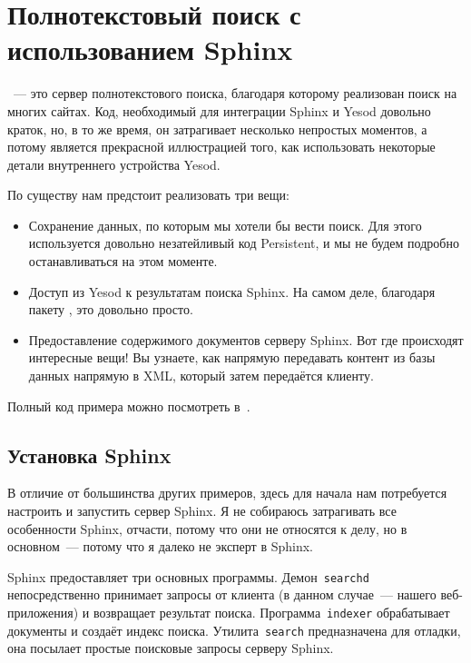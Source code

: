 \chapter{Полнотекстовый поиск с использованием Sphinx}\label{chap:sphinx}
~--- это сервер полнотекстового поиска, благодаря которому реализован поиск на многих сайтах. Код, необходимый для интеграции Sphinx и Yesod довольно краток, но, в то же время, он затрагивает несколько непростых моментов, а потому является прекрасной иллюстрацией того, как использовать некоторые детали внутреннего устройства Yesod.

По существу нам предстоит реализовать три вещи:
\begin{itemize}
  \item Сохранение данных, по которым мы хотели бы вести поиск. Для этого используется довольно незатейливый код Persistent, и мы не будем подробно останавливаться на этом моменте.
  \item Доступ из Yesod к результатам поиска Sphinx. На самом деле, благодаря пакету , это довольно просто.
  \item Предоставление содержимого документов серверу Sphinx. Вот где происходят интересные вещи! Вы узнаете, как напрямую передавать контент из базы данных напрямую в XML, который затем передаётся клиенту.
\end{itemize}

Полный код примера можно посмотреть в~.

\section{Установка Sphinx}
В отличие от большинства других примеров, здесь для начала нам потребуется настроить и запустить сервер Sphinx. Я не собираюсь затрагивать все особенности Sphinx, отчасти, потому что они не относятся к делу, но в основном~--- потому что я далеко не эксперт в Sphinx.

Sphinx предоставляет три основных программы. Демон~\lstinline!searchd! непосредственно принимает запросы от клиента (в данном случае~--- нашего веб-приложения) и возвращает результат поиска. Программа~\lstinline!indexer! обрабатывает документы и создаёт индекс поиска. Утилита~\lstinline!search! предназначена для отладки, она посылает простые поисковые запросы серверу Sphinx.

